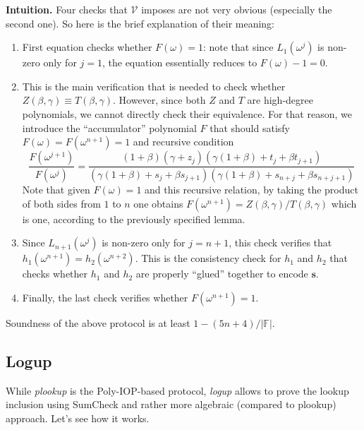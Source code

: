 \textbf{Intuition.} Four checks that $\mathcal{V}$ imposes are not very 
obvious (especially the second one). So here is the brief explanation of their meaning:
\begin{enumerate}
    \item First equation checks whether $F(\omega)=1$: note that since
    $L_1(\omega^j)$ is non-zero only for $j=1$, the equation essentially reduces
    to $F(\omega)-1=0$.
    \item This is the main verification that is needed to check whether
    $Z(\beta,\gamma) \equiv T(\beta,\gamma)$. However, since both $Z$ and $T$
    are high-degree polynomials, we cannot directly check their equivalence. For 
    that reason, we introduce the ``accumulator'' polynomial $F$ that should satisfy 
    $F(\omega) = F(\omega^{n+1}) = 1$ and recursive condition
    \begin{equation*}
        \frac{F(\omega^{j+1})}{F(\omega^j)} = \frac{(1+\beta)(\gamma+z_j)(\gamma(1+\beta)+t_j+\beta t_{j+1})}{(\gamma(1+\beta)+s_j+\beta s_{j+1})(\gamma(1+\beta) + s_{n+j} + \beta s_{n+j+1})}
    \end{equation*}
    Note that given $F(\omega)=1$ and this recursive relation, by taking the
    product of both sides from $1$ to $n$ one obtains
    $F(\omega^{n+1})=Z(\beta,\gamma)/T(\beta,\gamma)$ which is one, according to the
    previously specified lemma.
    \item Since $L_{n+1}(\omega^j)$ is non-zero only for $j=n+1$, this check
    verifies that $h_1(\omega^{n+1}) = h_2(\omega^{n+2})$. This is the
    consistency check for $h_1$ and $h_2$ that checks whether $h_1$ and $h_2$
    are properly ``glued'' together to encode $\boldsymbol{s}$.
    \item Finally, the last check verifies whether $F(\omega^{n+1})=1$.
\end{enumerate}

\begin{lemma}
    Soundness of the above protocol is at least $1-(5n+4)/|\mathbb{F}|$.
\end{lemma}

\subsection{Logup}

While \textit{plookup} is the Poly-IOP-based protocol, \textit{logup} allows to
prove the lookup inclusion using SumCheck and rather more algebraic (compared to
plookup) approach. Let's see how it works.

